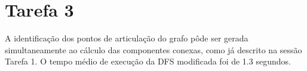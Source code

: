 \documentclass[10pt,a4paper]{report}
\begin{document}
\section*{Tarefa 3}

A identificação dos pontos de articulação do grafo pôde ser gerada simultaneamente ao cálculo das componentes conexas, como já descrito na sessão Tarefa 1. O tempo médio de execução da DFS modificada foi de 1.3 segundos.
\end{document}
